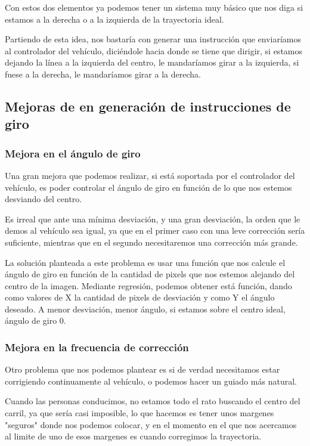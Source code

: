 Con estos dos elementos ya podemos tener un sistema muy básico que nos diga si estamos a la derecha o a la izquierda de la trayectoria ideal.

Partiendo de esta idea, nos bastaría con generar una instrucción que enviaríamos al controlador del vehículo, diciéndole hacia donde se tiene que dirigir, si estamos dejando la línea a la izquierda del centro, le mandaríamos girar a la izquierda, si fuese a la derecha, le mandaríamos girar a la derecha.

\subsection{Mejoras de en generación de instrucciones de giro}

\subsubsection{Mejora en el ángulo de giro}
Una gran mejora que podemos realizar, si está soportada por el controlador del vehículo, es poder controlar el ángulo de giro en función de lo que nos estemos desviando del centro. 

Es irreal que ante una mínima desviación, y una gran desviación, la orden que le demos al vehículo sea igual, ya que en el primer caso con una leve corrección sería suficiente, mientras que en el segundo necesitaremos una corrección más grande.

La solución planteada a este problema es usar una función que nos calcule el ángulo de giro en función de la cantidad de pixels que nos estemos alejando del centro de la imagen. Mediante regresión, podemos obtener está función, dando como valores de X la cantidad de pixels de desviación y como Y el ángulo deseado. A menor desviación, menor ángulo, si estamos sobre el centro ideal, ángulo de giro 0.

\subsubsection{Mejora en la frecuencia de corrección}
Otro problema que nos podemos plantear es si de verdad necesitamos estar corrigiendo continuamente al vehículo, o podemos hacer un guiado más natural.

Cuando las personas conducimos, no estamos todo el rato buscando el centro del carril, ya que sería casi imposible, lo que hacemos es tener unos margenes "seguros" donde nos podemos colocar, y en el momento en el que nos acercamos al limite de uno de esos margenes es cuando corregimos la trayectoria.

